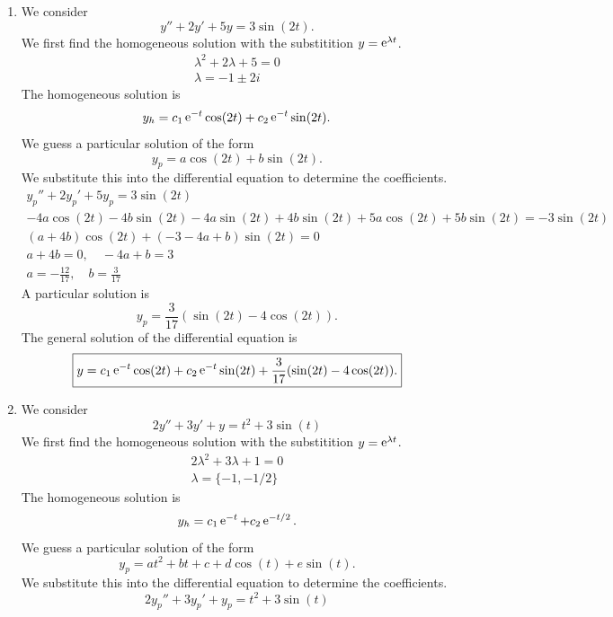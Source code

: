 {%
\begin{Solution}
  \label{solution y2y5y3sin2t}
  \begin{enumerate}
  \item 
    We consider
    \[
    y'' + 2 y' + 5 y = 3 \sin(2 t).
    \]
    We first find the homogeneous solution with the substitition $y = \mathop{\mathrm{e}}\nolimits^{\lambda t}$.
    \begin{gather*}
      \lambda^2 + 2 \lambda + 5 = 0 \\
      \lambda = -1 \pm 2 i
    \end{gather*}
    The homogeneous solution is
    \[
    y_h = c_1 \mathop{\mathrm{e}}\nolimits^{-t} \cos(2 t) + c_2 \mathop{\mathrm{e}}\nolimits^{-t} \sin(2 t).
    \]
    We guess a particular solution of the form
    \[
    y_p = a \cos(2 t) + b \sin(2 t).
    \]
    We substitute this into the differential equation to determine the 
    coefficients.
    \begin{gather*}
      y_p'' + 2 y_p' + 5 y_p = 3 \sin(2 t) \\
      -4 a \cos(2 t) -4 b \sin(2 t) - 4 a \sin(2 t) + 4 b \sin(2 t)
      + 5 a \cos(2 t) + 5 b \sin(2 t) = - 3 \sin(2 t) \\
      (a + 4 b) \cos(2 t) + (-3 - 4 a + b) \sin(2 t) = 0 \\
      a + 4 b = 0, \quad - 4 a + b = 3 \\
      a = - \frac{12}{17}, \quad b = \frac{3}{17}
    \end{gather*}
    A particular solution is
    \[
    y_p = \frac{3}{17} (\sin(2 t) - 4 \cos(2 t)).
    \]
    The general solution of the differential equation is
    \[
    \boxed{
      y = c_1 \mathop{\mathrm{e}}\nolimits^{-t} \cos(2 t) + c_2 \mathop{\mathrm{e}}\nolimits^{-t} \sin(2 t)
      + \frac{3}{17} (\sin(2 t) - 4 \cos(2 t)).
      }
    \]
  \item 
    We consider
    \[
    2 y'' + 3 y' + y = t^2 + 3 \sin(t)
    \]
    We first find the homogeneous solution with the substitition $y = \mathop{\mathrm{e}}\nolimits^{\lambda t}$.
    \begin{gather*}
      2 \lambda^2 + 3 \lambda + 1 = 0 \\
      \lambda = \{ -1, -1/2 \}
    \end{gather*}
    The homogeneous solution is
    \[
    y_h = c_1 \mathop{\mathrm{e}}\nolimits^{-t} + c_2 \mathop{\mathrm{e}}\nolimits^{-t/2}.
    \]
    We guess a particular solution of the form
    \[
    y_p = a t^2 + b t + c + d \cos(t) + e \sin(t).
    \]
    We substitute this into the differential equation to determine the 
    coefficients.
    \[
    2 y_p'' + 3 y_p' + y_p = t^2 + 3 \sin(t)
\]
\end{enumerate}
\end{Solution}}
